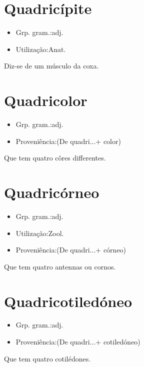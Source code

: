 \section{Quadricípite}
\begin{itemize}
\item {Grp. gram.:adj.}
\end{itemize}
\begin{itemize}
\item {Utilização:Anat.}
\end{itemize}
Diz-se de um músculo da coxa.
\section{Quadricolor}
\begin{itemize}
\item {Grp. gram.:adj.}
\end{itemize}
\begin{itemize}
\item {Proveniência:(De \textunderscore quadri...\textunderscore  + \textunderscore color\textunderscore )}
\end{itemize}
Que tem quatro côres differentes.
\section{Quadricórneo}
\begin{itemize}
\item {Grp. gram.:adj.}
\end{itemize}
\begin{itemize}
\item {Utilização:Zool.}
\end{itemize}
\begin{itemize}
\item {Proveniência:(De \textunderscore quadri...\textunderscore  + \textunderscore córneo\textunderscore )}
\end{itemize}
Que tem quatro antennas ou cornos.
\section{Quadricotiledóneo}
\begin{itemize}
\item {Grp. gram.:adj.}
\end{itemize}
\begin{itemize}
\item {Proveniência:(De \textunderscore quadri...\textunderscore  + \textunderscore cotiledóneo\textunderscore )}
\end{itemize}
Que tem quatro cotilédones.
